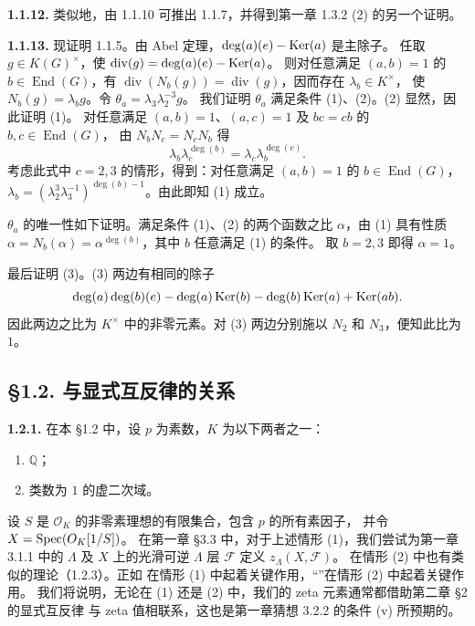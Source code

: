 \noindent\textbf{1.1.12.} 类似地，由 1.1.10 可推出 1.1.7，并得到第一章 1.3.2 (2) 的另一个证明。

\noindent\textbf{1.1.13.} 现证明 1.1.5。由 Abel 定理，$\deg(a)(e)-\operatorname{Ker}(a)$ 是主除子。
任取 $g\in K(G)^\times$，使 $\operatorname{div}(g)=\deg(a)(e)-\operatorname{Ker}(a)$。
则对任意满足 $(a,b)=1$ 的 $b\in\operatorname{End}(G)$，有
$\operatorname{div}(N_b(g))=\operatorname{div}(g)$，因而存在 $\lambda_b\in K^\times$，
使 $N_b(g)=\lambda_bg$。令 $\theta_a=\lambda_3\lambda_2^{-3}g$。
我们证明 $\theta_a$ 满足条件 (1)、(2)。(2) 显然，因此证明 (1)。
对任意满足 $(a,b)=1$、$(a,c)=1$ 及 $bc=cb$ 的 $b,c\in\operatorname{End}(G)$，
由 $N_bN_c=N_cN_b$ 得
\[
\lambda_b\lambda_c^{\deg(b)}=\lambda_c\lambda_b^{\deg(c)}.
\]
考虑此式中 $c=2,3$ 的情形，得到：对任意满足 $(a,b)=1$ 的
$b\in\operatorname{End}(G)$，
$\lambda_b=(\lambda_2^3\lambda_3^{-1})^{\deg(b)-1}$。由此即知 (1) 成立。

$\theta_a$ 的唯一性如下证明。满足条件 (1)、(2) 的两个函数之比 $\alpha$，由 (1) 具有性质
$\alpha=N_b(\alpha)=\alpha^{\deg(b)}$，其中 $b$ 任意满足 (1) 的条件。
取 $b=2,3$ 即得 $\alpha=1$。

最后证明 (3)。(3) 两边有相同的除子
\[
\deg(a)\deg(b)(e)-\deg(a)\operatorname{Ker}(b)-\deg(b)\operatorname{Ker}(a)+\operatorname{Ker}(ab).
\]
因此两边之比为 $K^\times$ 中的非零元素。对 (3) 两边分别施以 $N_2$ 和 $N_3$，便知此比为 $1$。

\subsection*{§1.2. 与显式互反律的关系}
\noindent\textbf{1.2.1.} 在本 §1.2 中，设 $p$ 为素数，$K$ 为以下两者之一：
\begin{enumerate}[label=(\arabic*)]
\item $\mathbb Q$；
\item 类数为 $1$ 的虚二次域。
\end{enumerate}
设 $S$ 是 $\mathcal O_K$ 的非零素理想的有限集合，包含 $p$ 的所有素因子，
并令 $X=\operatorname{Spec}(O_K[1/S])$。
在第一章 §3.3 中，对于上述情形 (1)，我们尝试为第一章 3.1.1 中的 $\Lambda$ 及
$X$ 上的光滑可逆 $\Lambda$ 层 $\mathscr F$ 定义
 $z_\Lambda(X,\mathscr F)$。
在情形 (2) 中也有类似的理论（1.2.3）。正如
在情形 (1) 中起着关键作用，“”在情形 (2) 中起着关键作用。
我们将说明，无论在 (1) 还是 (2) 中，我们的 zeta 元素通常都借助第二章 §2 的显式互反律
与 zeta 值相联系，这也是第一章猜想 3.2.2 的条件 (v) 所预期的。

